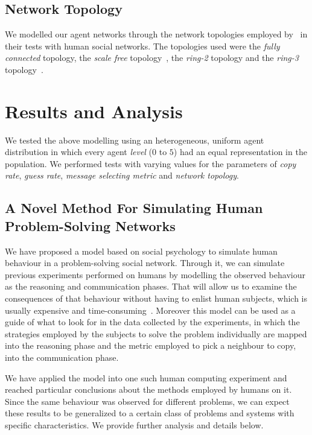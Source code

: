 \documentclass{article}
\begin{document}
\subsection{Network Topology}

We modelled our agent networks through the network topologies employed by~\cite{farenzena:collabem} in their tests with human social networks. The topologies used were the {\em fully connected} topology, the {\em scale free} topology~\cite{barabasi:linked}, the {\em ring-2} topology and the {\em ring-3} topology~\cite{newman:newtorks}.

\section{Results and Analysis}
\label{sec:results}

We tested the above modelling using an heterogeneous, uniform agent distribution in which every agent {\em level} ($0$ to $5$) %
had an equal representation in the population. We performed tests with varying values for the parameters of {\em copy rate}, {\em guess rate}, {\em message selecting metric} and {\em network topology}.

\subsection{A Novel Method For Simulating Human Problem-Solving Networks}

We have proposed a model based on social psychology to simulate human behaviour in a problem-solving social network. Through it, we can simulate previous experiments performed on humans by modelling the observed behaviour as the reasoning and communication phases. That will allow us to examine the consequences of that behaviour without having to enlist human subjects, which is usually expensive and time-consuming~\cite{?}. Moreover this model can be used as a guide of what to look for in the data collected by the experiments, in which the strategies employed by the subjects to solve the problem individually are mapped into the reasoning phase and the metric employed to pick a neighbour to copy, into the communication phase.

We have applied the model into one such human computing experiment and reached particular conclusions about the methods employed by humans on it. Since the same behaviour was observed for different problems, we can expect these results to be generalized to a certain class of problems and systems with specific characteristics. We provide further analysis and details below.
\end{document}
